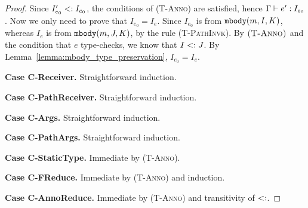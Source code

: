 \begin{proof}
Since $I'_{e_0} <: I_{e_0}$, the conditions of \textsc{(T-Anno)} are satisfied, hence $\Gamma \; {\vdash} \; e' : I_{e_0}$. Now we only need to prove that $I_{e_0} = I_e$. Since $I_{e_0}$ is from $\texttt{mbody}(m, I, K)$, whereas $I_e$ is from $\texttt{mbody}(m, J, K)$, by the rule  \textsc{(T-PathInvk)}. By $\textsc{(T-Anno)}$ and the condition that $e$ type-checks, we know that $I <: J$. By Lemma~\ref{lemma:mbody_type_preservation}, $I_{e_0} = I_e$.

\textbf{Case C-Receiver.} Straightforward induction.

\textbf{Case C-PathReceiver.} Straightforward induction.

\textbf{Case C-Args.} Straightforward induction.

\textbf{Case C-PathArgs.} Straightforward induction.

\textbf{Case C-StaticType.} Immediate by \textsc{(T-Anno)}.

\textbf{Case C-FReduce.} Immediate by \textsc{(T-Anno)} and induction.

\textbf{Case C-AnnoReduce.} Immediate by \textsc{(T-Anno)} and transitivity of $<:$.

\begin{comment}
\noindent \textbf{Case Invk.} 
let \[ e = \angl{J}\new I.m(\overline{\angl{I_e}}\overline{e}) \] 
Suppose \[ \mbody(m, I, J) = (J', \overline{I_x} \; \overline{x}, I_{e_0} \; e_0) \] 
then \[ e' =  [\overline{\angl{I_x}} \overline{e}/\overline{x}, \; \angl{J}\new I/\kwthis ] e_0 \] 
By rules \textsc{(T-New)} and \textsc{(T-Invk)}, 
  \[ \judgeewf \Gamma {\new I:I} \quad 
     \mtype(m, I, J) = \overline{I_x} \rightarrow I_{e_0} \quad 
     \judgeewf \Gamma {\overline{e} : \overline{I_e'}} \quad
     \overline{I_e'} \subtype \overline{I_x} \quad
     \textit{, for some } \; \overline{I_e'}
  \]
By Lemma~\ref{lemma0},
    \[
    \judgeewf {\Gamma, \overline{x}:\overline{I_x}, \kwthis:J_0} {e_0:I_f} \textit{, for some } J \subtype J_0 \textit{ and } I_f \subtype I_{e_0}
    \]
By Lemma~\ref{lemma1},
    \[
    \judgeewf {\Gamma} {[\overline{\angl{I_x}} \overline{e}/\overline{x}, \; \angl{J}\new I/\kwthis ] e_0  :  I_g} \textit{, for some } I_g \subtype I_f 
    \]
So $I_g <: I_{e_0}$, finally just let $I' = I_g$.


\end{comment}
\end{proof}
